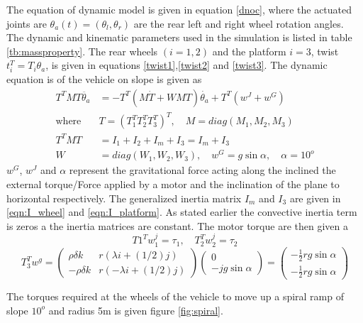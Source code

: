 The equation of  dynamic model  is given in equation \ref{dnoc}, where the actuated joints are  $\theta_a(t)=(\theta_l, \theta_r) $ are the rear left and right wheel rotation angles. The dynamic  and kinematic  parameters used in the simulation is listed in table \ref{tb:massproperty}. The rear wheels $(i=1,2)$ and the platform $i=3$, twist $t_i^T=T_i\theta_a$, is given in equations \ref{twist1},\ref{twist2} and \ref{twist3}. The dynamic equation is of the vehicle on slope is given as 
\begin{equation}
\label{dnoc}
\begin{aligned}
T^TMT\ddot{\theta_a}&=-T^T(M\dot{T}+WMT)\dot{\theta_a}+T^T(w^J+w^G)\\
\text{where} \quad &
T=(T_1^T T_2^T T_3^T)^T, \quad M=diag(M_1, M_2, M_3)\\
T^TMT &=I_1+I_2+I_m+I_3= I_m+I_3\\
W&=diag(W_1,W_2,W_3),\quad w^G=g\sin\alpha, \quad \alpha=10^o
\end{aligned}
\end{equation}
$w^G$, $ w^J$ and $\alpha$ represent the gravitational force acting along the inclined  the external torque/Force applied by a motor and the inclination of the plane to horizontal respectively. The generalized inertia matrix $I_m$ and $I_3$ are given in \ref{eqn:I_wheel} and \ref{eqn:I_platform}.
As stated earlier the convective inertia term is zeros a the inertia matrices are constant. The motor torque  are then given a 
\begin{equation}
T1^Tw_1^j=\tau_1, \quad T_2^Tw_2^j=\tau_2
\end{equation}
\begin{equation}
 T_3^Tw^g=\begin{pmatrix}
\rho\delta k & r(\lambda i+(1/2)j) \\
 -\rho\delta k & r(-\lambda i+(1/2)j)
\end{pmatrix}
\begin{pmatrix}
0\\
-jg\sin\alpha
\end{pmatrix}=\begin{pmatrix}
-\frac{1}{2}rg\sin\alpha\\ -\frac{1}{2}rg\sin\alpha
\end{pmatrix}
\end{equation} 

The torques required at the wheels of the vehicle to  move up a spiral ramp  of slope $10^o$ and radius 5m is given figure \ref{fig:spiral}. 

